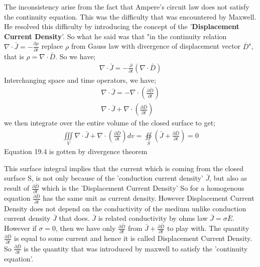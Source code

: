   
  The inconsistency arise from the fact that Ampere's circuit law does not satisfy the continuity equation. This was the difficulty that was encountered by Maxwell. He resolved this difficulty  by introducing the concept of the '\textbf{Displacement Current Density}'. So what he said was that "in the continuity relation $\nabla\cdot\bar{J}=-\frac{\partial\rho}{\partial t}$ replace $\rho$ from Gauss law with divergence of displacement vector $\bar{D}$", that is $\rho=\nabla\cdot\bar{D}$. So we have;
  \begin{align}
  \nabla\cdot\bar{J}=-\frac{\partial}{\partial t}(\nabla\cdot\bar{D})
  \end{align}
  Interchanging space and time operators, we have;
  \begin{align}
  \nabla\cdot\bar{J}=-\nabla\cdot(\frac{\partial\bar{D}}{\partial t}) \\ 
  \nabla\cdot\bar{J}+\nabla\cdot(\frac{\partial\bar{D}}{\partial t})
  \end{align}
  we then integrate over the entire volume of the closed surface to get;
    \begin{align}
    \iiint\limits_V\nabla\cdot\bar{J}+\nabla\cdot(\frac{\partial\bar{D}}{\partial t})dv=
     \oiint\limits_S(\bar{J}+\frac{\partial\bar{D}}{\partial t})=0
    \end{align}
   Equation 19.4 is gotten by divergence theorem
    
  This surface integral implies that the current which is coming from the closed surface S, is not only because of the 'conduction current density' $\bar{J}$, but also as  result of $\frac{\partial\bar{D}}{\partial t}$ which is the 'Displacement Current Density' So for a homogenous equation $\frac{\partial\bar{D}}{\partial t}$ has the same unit as current density. However Displacement Current Density does not depend on the conductivity of the medium unlike conduction current density $\bar{J}$ that does. $\bar{J}$ is related conductivity by ohms law $\bar{J}=\sigma\bar{E}$. However if $\sigma=0$, then we have only $\frac{\partial\bar{D}}{\partial t}$ from $\bar{J}+\frac{\partial\bar{D}}{\partial t}$ to play with. The quantity $\frac{\partial\bar{D}}{\partial t}$ is equal to some current and hence it is called Displacement Current Density. So $\frac{\partial\bar{D}}{\partial t}$ is the quantity that was introduced by maxwell to satisfy the 'continuity equation'.
  
